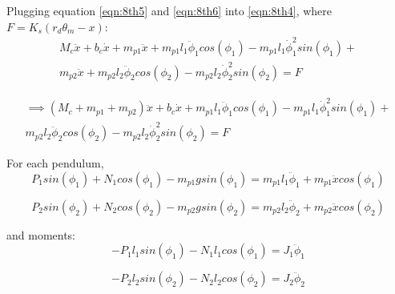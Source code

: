 \documentclass{article}
\begin{document}
Plugging equation \ref{eqn:8th5} and \ref{eqn:8th6} into \ref{eqn:8th4}, where $F = K_s ( r_d \theta_m - x )$:
\begin{equation*}
\begin{split}
M_c \ddot{x} + b_c \dot{x} + m_{p1} \ddot{x} + m_{p1} l_1 \ddot{\phi}_1 cos(\phi_1) - m_{p1} l_1 \dot{\phi}_1^2 sin(\phi_1) + \\
m_{p2} \ddot{x} + m_{p2} l_2 \ddot{\phi}_2 cos(\phi_2) - m_{p2} l_2 \dot{\phi}_2^2 sin(\phi_2) = F
\end{split}
\end{equation*}

\begin{equation}
\begin{split}
\implies (M_c + m_{p1} + m_{p2}) \ddot{x} + b_c \dot{x} + m_{p1} l_1 \ddot{\phi}_1 cos(\phi_1) - m_{p1} l_1 \dot{\phi}_1^2 sin(\phi_1) + \\
m_{p2} l_2 \ddot{\phi}_2 cos(\phi_2) - m_{p2} l_2 \dot{\phi}_2^2 sin(\phi_2) = F
\end{split}
\label{eqn:8th7}
\end{equation}

For each pendulum,
\begin{equation}
P_1 sin(\phi_1) + N_1 cos(\phi_1) - m_{p1} g sin(\phi_1) = m_{p1} l_1 \ddot{\phi}_1 + m_{p1} \ddot{x} cos(\phi_1)
\label{eqn:8th8}
\end{equation}

\begin{equation}
P_2 sin(\phi_2) + N_2 cos(\phi_2) - m_{p2} g sin(\phi_2) = m_{p2} l_2 \ddot{\phi}_2 + m_{p2} \ddot{x} cos(\phi_2)
\label{eqn:8th9}
\end{equation}

and moments:
\begin{equation}
-P_1 l_1 sin(\phi_1) - N_1 l_1 cos(\phi_1) = J_1 \ddot{\phi}_1
\label{eqn:8th10}
\end{equation}

\begin{equation}
-P_2 l_2 sin(\phi_2) - N_2 l_2 cos(\phi_2) = J_2 \ddot{\phi}_2
\label{eqn:8th11}
\end{equation}
\end{document}

